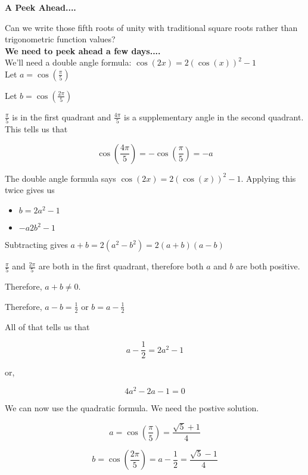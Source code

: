 \documentclass{ximera}
\begin{document}
\begin{claim} \textbf{\textcolor{purple!85!blue}{A Peek Ahead....}}

Can we write those fifth roots of unity with traditional square roots rather than trigonometric function values? \\


\textbf{\textcolor{purple!85!blue}{We need to peek ahead a few days....}} \\

We'll need a double angle formula:  $\cos(2x) = 2(\cos(x))^2 - 1$  \\


Let $a = \cos\left(\frac{\pi}{5}\right)$


Let $b = \cos\left(\frac{2\pi}{5}\right)$



$\frac{\pi}{5}$ is in the first quadrant and $\frac{4\pi}{5}$ is a supplementary angle in the second quadrant.  This tells us that


\[  \cos\left(\frac{4\pi}{5}\right) = -\cos\left(\frac{\pi}{5}\right) = -a  \]


The double angle formula says $\cos(2x) = 2(\cos(x))^2 - 1$.  Applying this twice gives us


\begin{itemize}
\item $b = 2a^2 - 1$ 
\item $-a 2b^2 - 1$
\end{itemize}


Subtracting gives   $a + b = 2 (a^2 - b^2) = 2 (a+b)(a-b)$


$\frac{\pi}{5}$ and $\frac{2\pi}{5}$ are both in the first quadrant, therefore both $a$ and $b$ are both positive.


Therefore, $a+b \ne 0$.

Therefore, $a - b = \frac{1}{2}$ or $b = a - \frac{1}{2}$


All of that tells us that 

\[       a - \frac{1}{2} = 2a^2 - 1      \]


or,


\[             4a^2 - 2 a - 1 =0\]




We can now use the quadratic formula.  We need the postive solution.



\[  a =   \cos\left(\frac{\pi}{5}\right) =  \frac{\sqrt{5} + 1}{4}   \]


\[  b =   \cos\left(\frac{2\pi}{5}\right) = a - \frac{1}{2} =  \frac{\sqrt{5} - 1}{4}   \]




\end{claim}
\end{document}
